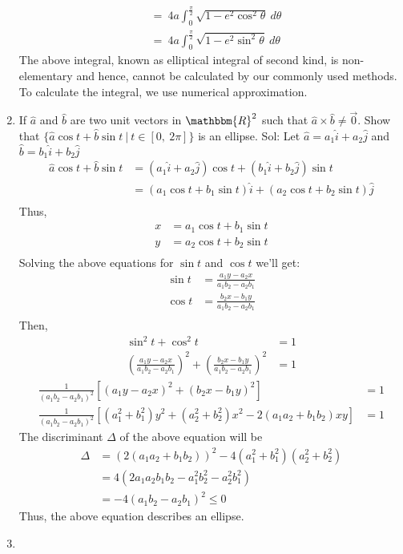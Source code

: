 \documentclass[14pt]{extarticle}
\newcommand{\bb}{\mathbbm}
\begin{document}
\begin{enumerate}
\begin{align*}
        &= \ 4a\int_{0}^{\frac{\pi}{2}} \sqrt{1-e^2\cos^2{\theta}} \ d\theta \\
        &= \ 4a\int_{0}^{\frac{\pi}{2}} \sqrt{1-e^2\sin^2{\theta}} \ d\theta
    \end{align*}
    The above integral, known as elliptical integral of second kind, is non-elementary and hence, cannot be calculated by our commonly used methods. To calculate the integral, we use numerical approximation.
    \newpage
    \item If $\hat{a}$ and $\hat{b}$ are two unit vectors in $\bb{R}^2$ such that $\hat{a} \times \hat{b} \neq \vec{0}$. Show that $\{\hat{a}\cos{t} + \hat{b}\sin{t} \  | \ t \in [0, \ 2\pi] \}$ is an ellipse.
    \newline \hfill \newline
    Sol:
    Let $\hat{a} = a_1\hat{i} + a_2\hat{j}$ and $\hat{b} = b_1\hat{i}+b_2\hat{j}$
    \begin{align*}
        \hat{a}\cos{t} + \hat{b}\sin{t} &= (a_1\hat{i} + a_2\hat{j})\cos{t} + (b_1\hat{i}+b_2\hat{j})\sin{t} \\
        &= (a_1\cos{t} + b_1\sin{t})\hat{i} + (a_2\cos{t} + b_2\sin{t})\hat{j} \\
    \end{align*}
    Thus,
    \begin{align*}
        x &= a_1\cos{t} + b_1\sin{t} \\
        y &= a_2\cos{t} + b_2\sin{t} \\
    \end{align*}
    Solving the above equations for $\sin{t}$ and $\cos{t}$ we'll get:
    \begin{align*}
        \sin{t} &= \frac{a_1y-a_2x}{a_1b_2-a_2b_1}\\
        \cos{t} &= \frac{b_2x-b_1y}{a_1b_2-a_2b_1}\\
    \end{align*}
    Then,
    \begin{align*}
        \sin^2{t} + \cos^2{t} &= 1 \\
        \left ( \frac{a_1y-a_2x}{a_1b_2-a_2b_1} \right )^2 + \left( \frac{b_2x-b_1y}{a_1b_2-a_2b_1} \right)^2 &= 1
    \end{align*}
    \newpage
    \begin{align*}
        \frac{1}{(a_1b_2-a_2b_1)^2}[(a_1y-a_2x)^2 + (b_2x-b_1y)^2] &= 1 \\
        \frac{1}{(a_1b_2-a_2b_1)^2}[(a_1^2+b_1^2)y^2+(a_2^2+b_2^2)x^2-2(a_1a_2+b_1b_2)xy] &= 1
    \end{align*}
    The discriminant $\Delta$ of the above equation will be
    \begin{align*}
        \Delta &= (2(a_1a_2+b_1b_2))^2 - 4(a_1^2+b_1^2)(a_2^2+b_2^2) \\
        &= 4(2a_1a_2b_1b_2 - a_1^2b_2^2-a_2^2b_1^2) \\
        &= -4(a_1b_2-a_2b_1)^2 \leq 0
    \end{align*}
    Thus, the above equation describes an ellipse.
    \newpage
    \item 
\end{enumerate}
\end{document}
